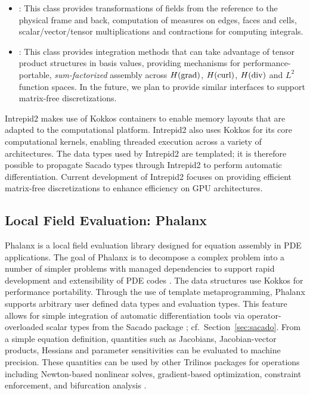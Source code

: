 \begin{itemize}
\item {}: This class provides transformations of fields from the reference to the physical frame and back, computation of measures on edges, faces and cells, scalar/vector/tensor multiplications and contractions for computing integrals.
\item {}: This class provides integration methods that can take advantage of tensor product structures in basis values, providing mechanisms for performance-portable, \emph{sum-factorized} assembly across $H({\rm grad})$, $H({\rm curl})$, $H({\rm div})$ and $L^2$ function spaces.  In the future, we plan to provide similar interfaces to support matrix-free discretizations.
\end{itemize}
Intrepid2 makes use of Kokkos containers to enable memory layouts that are adapted to the computational platform. Intrepid2 also uses Kokkos for its core computational kernels, enabling threaded execution across a variety of architectures. The data types used by Intrepid2 are templated; it is therefore possible to propagate Sacado types through Intrepid2 to perform automatic differentiation. Current development of Intrepid2 focuses on providing efficient matrix-free discretizations to enhance efficiency on GPU architectures. 

\subsection{Local Field Evaluation: Phalanx}
Phalanx is a local field evaluation library designed for equation assembly in PDE applications. The goal of Phalanx is to decompose a complex problem into a number of simpler problems with managed dependencies to support rapid development and extensibility of PDE codes \cite{Notz2012,pawlowski2012automating,pawlowski2012automatingpart2}. The data structures use Kokkos \cite{trott2021kokkos} for performance portability. Through the use of template metaprogramming, Phalanx supports arbitrary user defined data types and evaluation types. This feature allows for simple integration of automatic differentiation tools via operator-overloaded scalar types from the Sacado package \cite{phipps2022automatic}; cf.~Section~\ref{sec:sacado}. From a simple equation definition, quantities such as Jacobians, Jacobian-vector products, Hessians and parameter sensitivities can be evaluated to machine precision. These quantities can be used by other Trilinos packages for operations including Newton-based nonlinear solves, gradient-based optimization, constraint enforcement, and bifurcation analysis \cite{pawlowski2012automating,pawlowski2012automatingpart2}.

